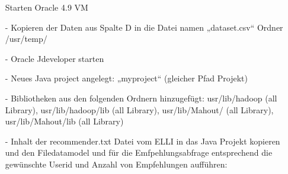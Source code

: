 \begin{itemize}
Starten Oracle 4.9 VM

\item[-] Kopieren der Daten aus Spalte D in die Datei namen „dataset.csv“ Ordner /usr/temp/

\item[-] Oracle Jdeveloper starten

\item[-] Neues Java project angelegt: „myproject“ (gleicher Pfad Projekt)

\item[-] Bibliotheken aus den folgenden Ordnern hinzugefügt:
usr/lib/hadoop (all Library),
usr/lib/hadoop/lib (all Library),
usr/lib/Mahout/ (all Library),
usr/lib/Mahout/lib (all Library)

\item[-] Inhalt der recommender.txt Datei vom ELLI in das Java Projekt kopieren und den Filedatamodel und für die Emfpehlungsabfrage entsprechend die gewünschte Userid und Anzahl von Empfehlungen aufführen:
\end{itemize}

